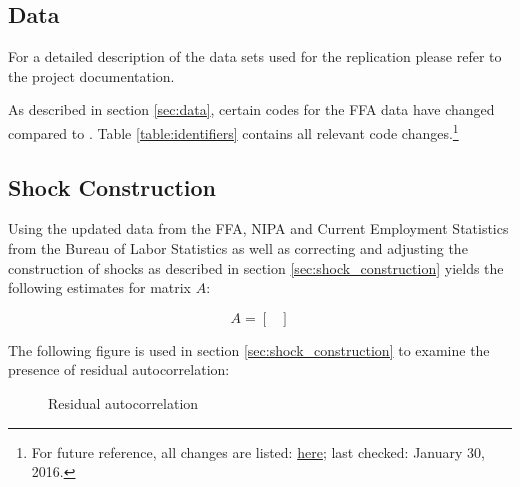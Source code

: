 \subsection{Data}
\label{sec:appendix_data}

For a detailed description of the data sets used for the replication please refer to the project documentation.

As described in section \ref{sec:data}, certain codes for the FFA data have changed compared to \citeauthor{JERMANNfinancial}. Table \ref{table:identifiers} contains all relevant code changes.\footnote{For future reference, all changes are listed: \href{http://www.federalreserve.gov/apps/fof/CodeChange.aspx}{here}; last checked: January 30, 2016.} 




\subsection{Shock Construction}
\label{sec:appendix_shock_construction}

Using the updated data from the FFA, NIPA and Current Employment Statistics from the Bureau of Labor Statistics as well as correcting and adjusting the construction of shocks as described in section \ref{sec:shock_construction} yields the following estimates for matrix $A$:
\begin{center}
\[
    A=
      \begin{bmatrix}
    	
      \end{bmatrix}
\]
\end{center}

The following figure is used in section \ref{sec:shock_construction} to examine the presence of residual autocorrelation:

\begin{figure}[ht]
	\caption{Residual autocorrelation}
	\label{fig:residual_autocorrelation}
\end{figure}